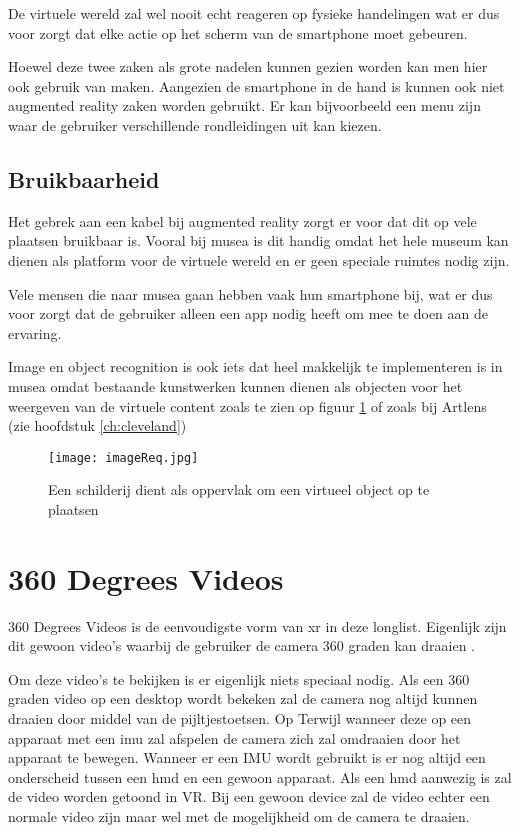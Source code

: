 De virtuele wereld zal wel nooit echt reageren op fysieke handelingen wat er dus voor zorgt dat elke actie op het scherm van de smartphone moet gebeuren.

Hoewel deze twee zaken als grote nadelen kunnen gezien worden kan men hier ook gebruik van maken. Aangezien de smartphone in de hand is kunnen ook niet augmented reality zaken worden gebruikt. Er kan bijvoorbeeld een menu zijn waar de gebruiker verschillende rondleidingen uit kan kiezen.

\subsection{Bruikbaarheid}
Het gebrek aan een kabel bij augmented reality zorgt er voor dat dit op vele plaatsen bruikbaar is. Vooral bij musea is dit handig omdat het hele museum kan dienen als platform voor de virtuele wereld en er geen speciale ruimtes nodig zijn.

Vele mensen die naar musea gaan hebben vaak hun smartphone bij, wat er dus voor zorgt dat de gebruiker alleen een app nodig heeft om mee te doen aan de ervaring.

Image en object recognition is ook iets dat heel makkelijk te implementeren is in musea omdat bestaande kunstwerken kunnen dienen als objecten voor het weergeven van de virtuele content zoals te zien op figuur \ref{fig:imageReq} of zoals bij Artlens (zie hoofdstuk \ref{ch:cleveland})

\begin{figure}
    \texttt{[image: imageReq.jpg]}
    \caption{Een schilderij dient als oppervlak om een virtueel object op te plaatsen \autocite{ARCO2017}}
    \label{fig:imageReq}
\end{figure}

\section{360 Degrees Videos}
360 Degrees Videos is de eenvoudigste vorm van \acrlong{xr} in deze longlist. Eigenlijk zijn dit gewoon video's waarbij de gebruiker de camera 360 graden kan draaien \autocite{Hosseini2016}.

Om deze video's te bekijken is er eigenlijk niets speciaal nodig. Als een 360 graden video op een desktop wordt bekeken zal de camera nog altijd kunnen draaien door middel van de pijltjestoetsen. Op Terwijl wanneer deze op een apparaat met een \acrshort{imu} zal afspelen de camera zich zal omdraaien door het apparaat te bewegen. Wanneer er een IMU wordt gebruikt is er nog altijd een onderscheid tussen een \acrshort{hmd} en een gewoon apparaat. Als een \acrshort{hmd} aanwezig is zal de video worden getoond in VR. Bij een gewoon device zal de video echter een normale video zijn maar wel met de mogelijkheid om de camera te draaien.

